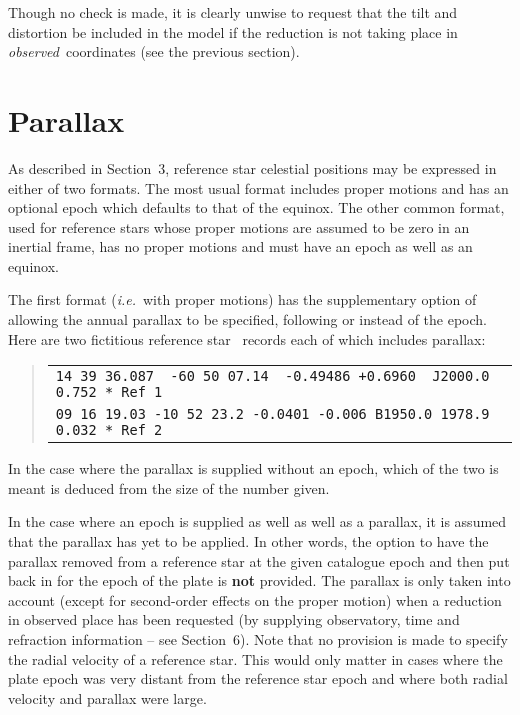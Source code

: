 Though no check is made, it is clearly unwise to request that the
tilt and distortion be included in the model if the reduction is
not taking place in {\it observed}\, coordinates (see the previous
section).

\section{Parallax}
As described in Section~3, reference star celestial positions
may be expressed in either of two formats.  The most usual format includes
proper motions and has an optional epoch which defaults to that
of the equinox.  The other common format, used for reference stars whose
proper motions are assumed to be zero in an inertial frame,
has no proper motions and must have an epoch as well as an equinox.

The first format ({\it i.e.}\ with proper motions) has the
supplementary option of allowing the annual parallax to be specified,
following or instead of the epoch.  Here are two fictitious
reference star \radec\ records each of which includes parallax:

\goodbreak
\begin{quote}
\begin{tabular}{|l|}
\hline
\verb|14 39 36.087  -60 50 07.14  -0.49486 +0.6960  J2000.0  0.752 * Ref 1| \\
\verb|09 16 19.03 -10 52 23.2 -0.0401 -0.006 B1950.0 1978.9 0.032 * Ref 2| \\
\hline
\end{tabular}
\end{quote}

In the case where the parallax is
supplied without an epoch, which of the two is meant is deduced from
the size of the number given.

In the case where an epoch is supplied as well as well as a parallax,
it is assumed that the parallax has yet to be applied.  In other words,
the option to have the parallax removed from a reference
star at the given catalogue epoch and then put back in for
the epoch of the plate is {\bf not} provided.  The parallax is
only taken into account (except for second-order effects on
the proper motion) when a reduction in observed place
has been requested (by supplying observatory, time and
refraction information -- see Section~6).  Note that no
provision is made to specify the radial velocity of a
reference star.  This would only matter in cases where the
plate epoch was very distant from the reference star epoch
and where both radial velocity and parallax were large.

